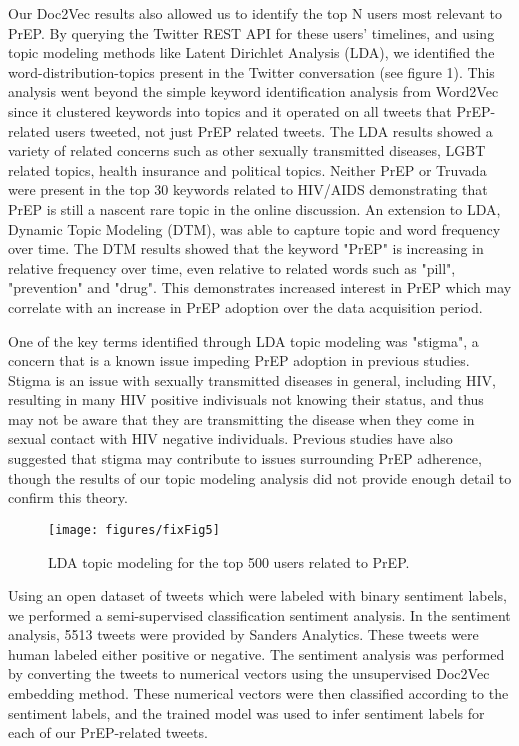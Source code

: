 Our Doc2Vec results also allowed us to identify the top N users most relevant to PrEP. By querying the Twitter REST API for these users' timelines, and using topic modeling methods like Latent Dirichlet Analysis (LDA), we identified the word-distribution-topics present in the Twitter conversation (see figure 1). This analysis went beyond the simple keyword identification analysis from Word2Vec since it clustered keywords into topics and it operated on all tweets that PrEP-related users tweeted, not just PrEP related tweets. The LDA results showed a variety of related concerns such as other sexually transmitted diseases, LGBT related topics, health insurance and political topics. Neither PrEP or Truvada were present in the top 30 keywords related to HIV/AIDS demonstrating that PrEP is still a nascent rare topic in the online discussion. An extension to LDA, Dynamic Topic Modeling (DTM), was able to capture topic and word frequency over time. The DTM results showed that the keyword "PrEP" is increasing in relative frequency over time, even relative to related words such as "pill", "prevention" and "drug". This demonstrates increased interest in PrEP which may correlate with an increase in PrEP adoption over the data acquisition period.

One of the key terms identified through LDA topic modeling was "stigma", a concern that is a known issue impeding PrEP adoption in previous studies\cite{liu2014early}. Stigma is an issue with sexually transmitted diseases in general, including HIV, resulting in many HIV positive indivisuals not knowing their status, and thus may not be aware that they are transmitting the disease when they come in sexual contact with HIV negative individuals. Previous studies have also suggested that stigma may contribute to issues surrounding PrEP adherence, though the results of our topic modeling analysis did not provide enough detail to confirm this theory.

\begin{figure*}
\centering
\texttt{[image: figures/fixFig5]}
\caption{LDA topic modeling for the top 500 users related to PrEP.}
\label{fig:lda}
\end{figure*}

Using an open dataset of tweets which were labeled with binary sentiment labels, we performed a semi-supervised classification sentiment analysis. In the sentiment analysis, 5513 tweets were provided by Sanders Analytics. These tweets were human labeled either positive or negative. The sentiment analysis was performed by converting the tweets to numerical vectors using the unsupervised Doc2Vec embedding method. These numerical vectors were then classified according to the sentiment labels, and the trained model was used to infer sentiment labels for each of our PrEP-related tweets.

